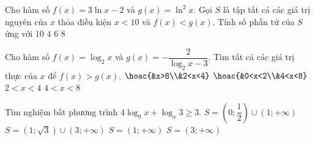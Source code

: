 \begin{ex}%
	Cho hàm số $f(x)=3\ln x-2$ và $g(x)=\ln ^2x$. Gọi $S$ là tập tất cả các giá trị nguyên của $x$ thỏa điều kiện $x<10$ và $f(x)<g(x)$. Tính số phần tử của $S$ ứng với
	\choice
	{$10$}
	{\True $4$}
	{$6$}
	{$8$}
\end{ex}
\begin{ex}%
	Cho hàm số $f(x)=\log_2x$ và $g(x)=-\dfrac{2}{\log_2x-3}$. Tìm tất cả các giá trị thực của $x$ để $f(x)>g(x)$. 
	\choice
	{\True $\hoac{&x>8\\&2<x<4}$}
	{$\hoac{&0<x<2\\&4<x<8}$}
	{$2<x<4$}
	{$4<x<8$}
\end{ex}
\begin{ex}%
	Tìm nghiệm bất phương trình $4\log_9x+\log_x3\geq 3$. 
	\choice
	{$S=\left(0;\dfrac{1}{2}\right)\cup(1;+\infty)$}
	{\True $S=(1;\sqrt{3})\cup(3;+\infty)$}
	{$S=(1;+\infty)$}
	{$S=(3;+\infty)$}
\end{ex}
